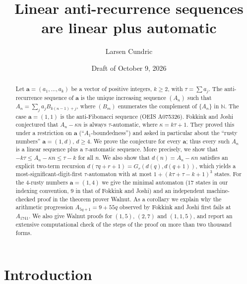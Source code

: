 \documentclass[11pt]{amsart}
\title{Linear anti-recurrence sequences are linear plus automatic}
\author{Larsen Cundric}
\date{Draft of October 9, 2026}
\theoremstyle{definition}
\theoremstyle{remark}
\newcommand{\N}{\mathbb{N}}
\begin{document}
\begin{abstract}
Let $\mathbf a=(a_1,\dots,a_k)$ be a vector of positive integers, $k\ge 2$, with $\tau=\sum a_j$. The anti-recurrence sequence of $\mathbf a$ is the unique increasing sequence $(A_n)$ such that $A_n=\sum_j a_jB_{k(n-1)+j}$, where $(B_m)$ enumerates the complement of $\{A_n\}$ in $\N$. The case $\mathbf a=(1,1)$ is the anti-Fibonacci sequence (OEIS A075326). Fokkink and Joshi conjectured that $A_n-\kappa n$ is always $\tau$-automatic, where $\kappa=k\tau+1$. They proved this under a restriction on $\mathbf a$ (``$A_1$-boundedness'') and asked in particular about the ``rusty numbers'' $\mathbf a=(1,d)$, $d\ge4$. We prove the conjecture for every $\mathbf a$; thus every such $A_n$ is a linear sequence plus a $\tau$-automatic sequence. More precisely, we show that $-k\tau\le A_n-\kappa n\le \tau-k$ for all $n$. We also show that $d(n)=A_n-\kappa n$ satisfies an explicit two-term recursion $d(\tau q+r+1)=G_r(d(q),d(q+1))$, which yields a most-significant-digit-first $\tau$-automaton with at most $1+(k\tau+\tau-k+1)^3$ states. For the $4$-rusty numbers $\mathbf a=(1,4)$ we give the minimal automaton ($17$ states in our indexing convention, $9$ in that of Fokkink and Joshi) and an independent machine-checked proof in the theorem prover Walnut. As a corollary we explain why the arithmetic progression $A_{5q+1}=9+55q$ observed by Fokkink and Joshi first fails at $A_{1741}$. We also give Walnut proofs for $(1,5)$, $(2,7)$ and $(1,1,5)$, and report an extensive computational check of the steps of the proof on more than two thousand forms.
\end{abstract}
\maketitle

\section{Introduction}
\end{document}
